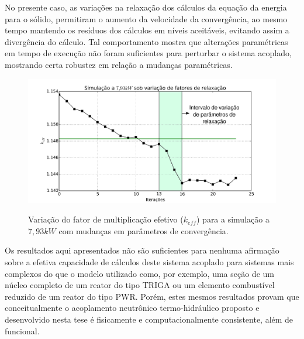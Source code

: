No presente caso, as variações na relaxação dos cálculos da equação da energia para
o sólido, permitiram o aumento da velocidade da convergência, ao mesmo tempo mantendo
os resíduos dos cálculos em níveis aceitáveis, evitando assim a divergência do cálculo.
Tal comportamento mostra que alterações paramétricas em tempo de execução não foram
suficientes para perturbar o sistema acoplado, mostrando certa robustez em relação
a mudanças paramétricas.

\begin{figure}[htb]
  \caption[Variação do fator de multiplicação sobe variação de parâmetros de convergência.]{Variação do fator de multiplicação efetivo ($k_{eff}$) para a simulação a $7,93 kW$ com mudanças em parâmetros de convergência.}
  \centering\includegraphics[scale=0.5]{figuras/plot200-disturb-port.png}
  \label{fig:keff_dist}
\end{figure}


Os resultados aqui apresentados não são suficientes para nenhuma afirmação sobre a
efetiva capacidade de cálculos deste sistema acoplado para sistemas mais complexos
do que o modelo utilizado como, por exemplo, uma seção de um núcleo completo de um
reator do tipo TRIGA ou um elemento combustível reduzido de um reator do tipo PWR.
Porém, estes mesmos resultados provam que conceitualmente o acoplamento neutrônico
termo-hidráulico proposto e desenvolvido nesta tese é fisicamente e computacionalmente
consistente, além de funcional.

